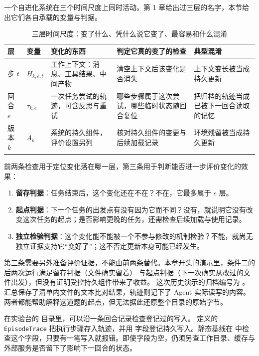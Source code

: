 一个自进化系统在三个时间尺度上同时活动。第 1 章给出过三层的名字，本节给出它们各自承载的变量与判据。

\begin{table}[htbp]
\centering
\caption{三层时间尺度：变了什么、凭什么说它变了、最容易和什么混淆}
\label{tab:layers}
\begin{tabular}{>{\raggedright\arraybackslash}p{1.6cm}>{\raggedright\arraybackslash}p{2.0cm}>{\raggedright\arraybackslash}p{3.6cm}>{\raggedright\arraybackslash}p{3.4cm}>{\raggedright\arraybackslash}p{3.0cm}}
\toprule
层 & 变量 & 变化的东西 & 判定它真的变了的检查 & 典型混淆 \\
\midrule
步 $t$ & $H_{k,e,t}$ & 工作上下文：消息、工具结果、中间产物 & 清空上下文后该变化是否消失 & 上下文变长被当成持久更新 \\
回合 $e$ & $\tau_{k,e}$ & 一次任务尝试的轨迹，可含反思与重试 & 哪些步骤属于这次尝试，哪些临时状态随回合复位 & 把归档的轨迹当成已被下一回合读取的记忆 \\
版本 $k$ & $A_k$ & 系统的持久组件，评价设置另列 & 核对持久组件的变更与后续加载记录 & 环境残留被当成持久更新 \\
\bottomrule
\end{tabular}
\end{table}

前两条检查用于定位变化落在哪一层，第三条用于判断能否进一步评价变化的效果：

\begin{enumerate}
  \item \textbf{留存判据}：任务结束后，这个变化还在不在？不在，它最多属于 $e$ 层。
  \item \textbf{起点判据}：下一个任务的出发点有没有因为它而不同？没有，就说明它没有改变这次任务的起点；是否影响更晚的任务，还需检查后续加载与使用记录。
  \item \textbf{独立检验判据}：这个变化能不能被一个不参与修改的机制检验？不能，就尚无独立证据支持它“变好了”；这不否定更新本身可能已经发生。
\end{enumerate}

第三条需要另外准备评价证据，不能由前两条替代。本章开头的演示里，条件二的后两次运行满足留存判据（文件确实留着）
与起点判据（下一次确实从改过的文件出发），但没有证明受控持久组件带来了收益。
这次历史演示的归档编号为 。汇总保存了清单内文件的文本比对结果，轨迹则记下了 Agent 实际读写的内容。两者都能帮助解释这道题的起点，但无法据此还原整个目录的原始字节。

在实验台的  目录里，可以沿一条回合记录检查登记过的写入。 定义的 \texttt{EpisodeTrace} 把执行步骤存入轨迹，并用  字段登记持久写入。静态基线在  中检查这个字段，只要有一笔写入就报错。即使字段为空，仍须另查工作目录、缓存与外部服务是否留下了影响下一回合的状态。

